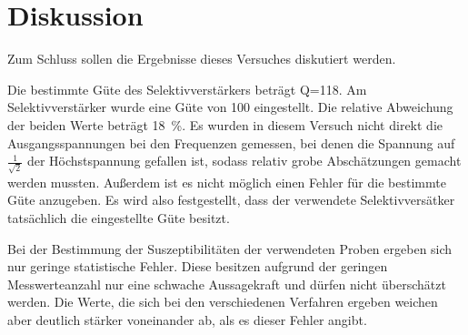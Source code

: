 
\section{Diskussion}
%
Zum Schluss sollen die Ergebnisse dieses Versuches diskutiert werden. 

Die bestimmte Güte des Selektivverstärkers beträgt Q=\num{118}. Am Selektivverstärker wurde eine Güte von 100 eingestellt. Die relative Abweichung der beiden Werte beträgt \SI{18}{\percent}. Es wurden in diesem Versuch nicht direkt die Ausgangsspannungen bei den Frequenzen gemessen, bei denen die Spannung auf $\frac{1}{\sqrt{2}}$ der Höchstspannung gefallen ist, sodass relativ grobe Abschätzungen gemacht werden mussten. Außerdem ist es nicht möglich einen Fehler für die bestimmte Güte anzugeben.
Es wird also festgestellt, dass der verwendete Selektivversätker tatsächlich die eingestellte Güte besitzt.

Bei der Bestimmung der Suszeptibilitäten der verwendeten Proben ergeben sich nur geringe statistische Fehler. Diese besitzen aufgrund der geringen Messwerteanzahl nur eine schwache Aussagekraft und dürfen nicht überschätzt werden.
Die Werte, die sich bei den verschiedenen Verfahren ergeben weichen aber deutlich stärker voneinander ab, als es dieser Fehler angibt.
%